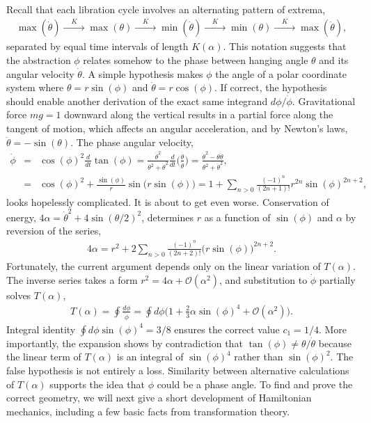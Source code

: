 \documentclass[nofootinbib,preprint]{revtex4-1}
\begin{document}
Recall that each libration cycle involves an alternating pattern of extrema,
\begin{eqnarray}
\max(\dot{\theta}) \xrightarrow{\;\;\;\;K\;\;\;\;} \max(\theta) 
 \xrightarrow{\;\;\;\;K\;\;\;\;} \min(\dot{\theta})
 \xrightarrow{\;\;\;\;K\;\;\;\;} \min(\theta) 
 \xrightarrow{\;\;\;\;K\;\;\;\;} \max(\dot{\theta}) \nonumber,
\end{eqnarray} 
separated by equal time intervals of length $K(\alpha)$. This notation suggests that the 
abstraction $\phi$ relates somehow to the phase between hanging angle $\theta$ and its angular 
velocity $\dot{\theta}$. A simple hypothesis makes $\phi$ the angle of a polar coordinate
system where $\theta=r\sin(\phi)$ and $\dot{\theta}=r\cos(\phi)$. If correct, the hypothesis should 
enable another derivation of the exact same integrand $d\phi/\dot{\phi}$. Gravitational force 
$mg=1$ downward along the vertical results in a partial force along the tangent of motion, 
which affects an angular acceleration, and by Newton's laws, $\ddot{\theta}=-\sin(\theta)$. 
The phase angular velocity,
\begin{eqnarray}
\dot{\phi} &=& \cos(\phi)^2 \frac{d}{dt} \tan(\phi) 
= \frac{\dot{\theta}^2}{\theta^2+\dot{\theta}^2}\frac{d}{dt}\bigg(\frac{\theta}{\dot{\theta}}\bigg)
=\frac{\dot{\theta}^2-\theta\ddot{\theta} }{\theta^2+\dot{\theta}^2}, \nonumber \\
&=& \cos(\phi)^2+\frac{\sin(\phi)}{r}\sin\big(r \sin(\phi)\big) \nonumber 
 = 1+\sum_{n>0} \frac{(-1)^n}{(2n+1)!} r^{2n} \sin(\phi)^{2n+2}, \nonumber
\end{eqnarray}
looks hopelessly complicated. It is about to get even worse. Conservation of 
energy, ${4 \alpha=\dot{\theta}^2+4 \sin(\theta/2)^2}$, 
determines $r$ as a function of $\sin(\phi)$ and $\alpha$ by reversion of the series,
\begin{eqnarray}
4\alpha = r^2 + 2\sum_{n>0}\frac{(-1)^n }{(2n+2)!} \big(r \sin(\phi)\big)^{2n+2} . \nonumber
\end{eqnarray}
Fortunately, the current argument depends only on the 
linear variation of $T(\alpha)$. The inverse series takes a form $r^2=4\alpha + \mathcal{O}(\alpha^2)$, 
and substitution to $\dot{\phi}$ partially solves $T(\alpha)$, 
\begin{eqnarray}
T(\alpha)= \oint \frac{d\phi}{\dot{\phi}} = \oint d\phi\bigg(1+\frac{2}{3}\alpha\sin(\phi)^4 + \mathcal{O}(\alpha^2) \bigg).\nonumber
\end{eqnarray}
Integral identity $\oint d\phi \sin(\phi)^4=3/8$ ensures the correct value $c_1=1/4$. More 
importantly, the expansion shows by contradiction that $\tan(\phi) \neq \theta/\dot{\theta}$ 
because the linear term of $T(\alpha)$ is an integral of $\sin(\phi)^4$ rather than $\sin(\phi)^2$.
The false hypothesis is not entirely a loss. Similarity between alternative calculations of 
$T(\alpha)$ supports the idea that $\phi$ could be a phase angle. To find and prove the correct 
geometry, we will next give a short development of Hamiltonian mechanics, including a few basic 
facts from transformation theory.
\end{document}
